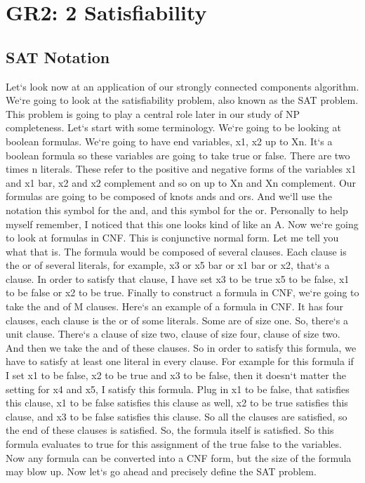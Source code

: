 \section{GR2: 2 Satisfiability}

\subsection{SAT  Notation}
Let`s look now at an application of our strongly connected components algorithm.
We`re going to look at the satisfiability problem, also known as the SAT problem.
This problem is going to play a central role later in our study of NP completeness.
Let`s start with some terminology.
We`re going to be looking at boolean formulas.
We`re going to have end variables, x1, x2 up to Xn.
It`s a boolean formula so these variables are going to take true or false.
There are two times n literals.
These refer to the positive and negative forms of the variables x1 and x1 bar, x2 and x2 complement and so on up to Xn and Xn complement.
Our formulas are going to be composed of knots ands and ors.
And we`ll use the notation this symbol for the and, and this symbol for the or.
Personally to help myself remember, I noticed that this one looks kind of like an A\@.
Now we`re going to look at formulas in CNF\@.
This is conjunctive normal form.
Let me tell you what that is.
The formula would be composed of several clauses.
Each clause is the or of several literals, for example, x3 or x5 bar or x1 bar or x2, that`s a clause.
In order to satisfy that clause, I have set x3 to be true x5 to be false, x1 to be false or x2 to be true.
Finally to construct a formula in CNF, we`re going to take the and of M clauses.
Here`s an example of a formula in CNF\@.
It has four clauses, each clause is the or of some literals.
Some are of size one.
So, there`s a unit clause.
There`s a clause of size two, clause of size four, clause of size two.
And then we take the and of these clauses.
So in order to satisfy this formula, we have to satisfy at least one literal in every clause.
For example for this formula if I set x1 to be false, x2 to be true and x3 to be false, then it doesn`t matter the setting for x4 and x5, I satisfy this formula.
Plug in x1 to be false, that satisfies this clause, x1 to be false satisfies this clause as well, x2 to be true satisfies this clause, and x3 to be false satisfies this clause.
So all the clauses are satisfied, so the end of these clauses is satisfied.
So, the formula itself is satisfied.
So this formula evaluates to true for this assignment of the true false to the variables.
Now any formula can be converted into a CNF form, but the size of the formula may blow up.
Now let`s go ahead and precisely define the SAT problem.

